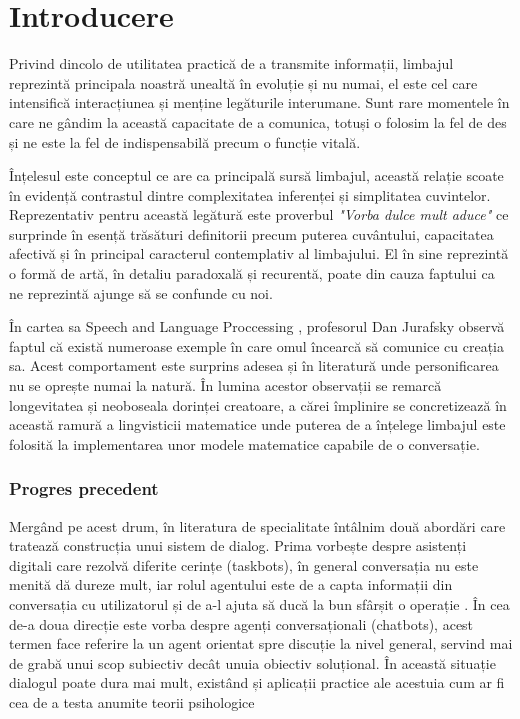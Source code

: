\chapter{Introducere}


Privind dincolo de utilitatea practică de a transmite informații, limbajul reprezintă principala noastră unealtă în evoluție și nu numai, el este cel care intensifică interacțiunea și menține legăturile interumane. Sunt rare momentele în care ne gândim la această capacitate de a comunica, totuși o folosim la fel de des și ne este la fel de indispensabilă precum o funcție vitală.

Înțelesul este conceptul ce are ca principală sursă limbajul, această relație scoate în evidență contrastul dintre complexitatea inferenței și simplitatea cuvintelor. Reprezentativ pentru această legătură este proverbul \textit{"Vorba dulce mult aduce"} ce surprinde în esență trăsături definitorii precum puterea cuvântului, capacitatea afectivă și în principal caracterul contemplativ al limbajului. El în sine reprezintă o formă de artă, în detaliu paradoxală și recurentă, poate din cauza faptului ca ne reprezintă ajunge să se confunde cu noi.

În cartea sa Speech and Language Proccessing \cite{speach__lang_processing}, profesorul Dan Jurafsky observă faptul că există numeroase exemple în care omul încearcă să comunice cu creația sa. Acest comportament este surprins adesea și în literatură unde personificarea nu se oprește numai la natură. În lumina acestor observații se remarcă longevitatea și neoboseala dorinței creatoare, a cărei împlinire se concretizează în această ramură a lingvisticii matematice unde puterea de a înțelege limbajul este folosită la implementarea unor modele matematice capabile de o conversație.

\subsection{Progres precedent}
Mergând pe acest drum, în literatura de specialitate întâlnim două abordări care tratează construcția unui sistem de dialog. Prima vorbește despre asistenți digitali care rezolvă diferite cerințe (taskbots), în general conversația nu este menită dă dureze mult, iar rolul agentului este de a capta informații din conversația cu utilizatorul și de a-l ajuta să ducă la bun sfârșit o operație \cite{joint_online_bing, att_joint_bing}. În cea de-a doua direcție este vorba despre agenți conversaționali (chatbots), acest termen face referire la un agent orientat spre discuție la nivel general, servind mai de grabă unui scop subiectiv decât unuia obiectiv soluțional. În această situație dialogul poate dura mai mult, existând și aplicații practice ale acestuia cum ar fi cea de a testa anumite teorii psihologice \cite{weizenbaum}

